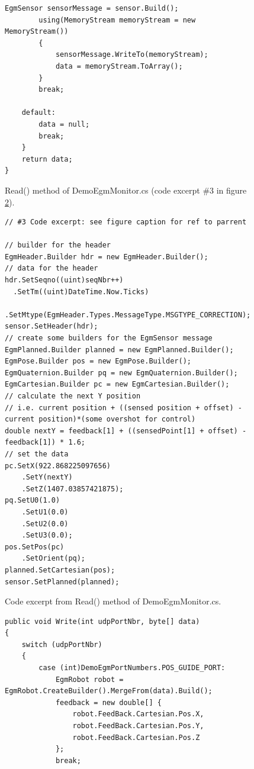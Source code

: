 \documentclass{cslthse-msc}
\begin{document}
\begin{appendices}
\begin{figure}[H]
\begin{lstlisting}[fontadjust]
        EgmSensor sensorMessage = sensor.Build();
        using(MemoryStream memoryStream = new MemoryStream())
        {
            sensorMessage.WriteTo(memoryStream);
            data = memoryStream.ToArray();
        }
        break;

    default:
        data = null;
        break;
    }
    return data;
}
\end{lstlisting}
\caption{Read() method of DemoEgmMonitor.cs (code excerpt \#3 in figure \ref{fig:DemoEgmMonitor_Read2}).}
\label{fig:DemoEgmMonitor_Read1}
\end{figure}

\lstset{language=[Sharp]C}
\begin{figure}[H]
\centering
\begin{lstlisting}[fontadjust]
// #3 Code excerpt: see figure caption for ref to parrent

// builder for the header
EgmHeader.Builder hdr = new EgmHeader.Builder();
// data for the header
hdr.SetSeqno((uint)seqNbr++)
  .SetTm((uint)DateTime.Now.Ticks)
  .SetMtype(EgmHeader.Types.MessageType.MSGTYPE_CORRECTION);
sensor.SetHeader(hdr);
// create some builders for the EgmSensor message
EgmPlanned.Builder planned = new EgmPlanned.Builder();
EgmPose.Builder pos = new EgmPose.Builder();
EgmQuaternion.Builder pq = new EgmQuaternion.Builder();
EgmCartesian.Builder pc = new EgmCartesian.Builder();
// calculate the next Y position 
// i.e. current position + ((sensed position + offset) - current position)*(some overshot for control)
double nextY = feedback[1] + ((sensedPoint[1] + offset) - feedback[1]) * 1.6;
// set the data
pc.SetX(922.868225097656)
    .SetY(nextY)
    .SetZ(1407.03857421875);
pq.SetU0(1.0)
    .SetU1(0.0)
    .SetU2(0.0)
    .SetU3(0.0);
pos.SetPos(pc)
    .SetOrient(pq);
planned.SetCartesian(pos); 
sensor.SetPlanned(planned);
\end{lstlisting}
\caption{Code excerpt from Read() method of DemoEgmMonitor.cs.}
\label{fig:DemoEgmMonitor_Read2}
\end{figure}


\lstset{language=[Sharp]C}
\begin{figure}[H]
\centering
\begin{lstlisting}[fontadjust]
public void Write(int udpPortNbr, byte[] data)
{
    switch (udpPortNbr)
    {
        case (int)DemoEgmPortNumbers.POS_GUIDE_PORT:
            EgmRobot robot = EgmRobot.CreateBuilder().MergeFrom(data).Build();
            feedback = new double[] {
                robot.FeedBack.Cartesian.Pos.X,
                robot.FeedBack.Cartesian.Pos.Y,
                robot.FeedBack.Cartesian.Pos.Z
            };
            break;


\end{lstlisting}
\end{figure}
\end{appendices}
\end{document}
